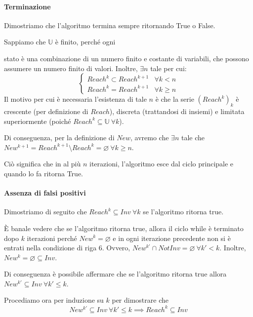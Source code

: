 \documentclass[12pt]{article}
\begin{document}
    \paragraph{Terminazione}
    Dimostriamo che l'algoritmo termina sempre ritornando True o False.

    Sappiamo che $\mathbb U$ è finito, perché ogni 
    
    stato è una combinazione di un numero finito e costante di variabili, che possono assumere un numero finito di valori.
    Inoltre, $\exists n$ tale per cui:
    $$
    \begin{cases}
          Reach^k \subset Reach^{k+1} & \forall k < n \\
          Reach^k = Reach^{k+1} & \forall k \geq n
    \end{cases}
    $$
    Il motivo per cui è necessaria l'esistenza di tale $n$ è che la serie $(Reach^k)_k$ è crescente (per definizione di $Reach$), discreta (trattandosi di insiemi) e limitata superiormente (poiché $Reach^k \subseteq \mathbb U\ \forall k$).
    
    Di conseguenza, per la definizione di $New$, avremo che $\exists n$ tale che $New^{k+1} = Reach^{k+1} \setminus Reach^k = \varnothing\ \forall k \geq n$.

    Ciò significa che in al più $n$ iterazioni, l'algoritmo esce dal ciclo principale e quando lo fa ritorna True. 

    \paragraph{Assenza di falsi positivi}
    Dimostriamo di seguito che $Reach^k \subseteq Inv\ \forall k$ se l'algoritmo ritorna true.

    È banale vedere che se l'algoritmo ritorna true, allora il ciclo while è terminato dopo $k$ iterazioni perché $New^k = \varnothing$ e in ogni iterazione precedente non si è entrati nella condizione di riga 6. Ovvero, $New^{k'} \cap NotInv = \varnothing\ \forall k' < k$.
    Inoltre, $New^k = \varnothing \subseteq Inv$.

    Di conseguenza è possibile affermare che se l'algoritmo ritorna true allora $New^{k'} \subseteq Inv\ \forall k' \leq k$.

    Procediamo ora per induzione su $k$ per dimostrare che 
    \begin{equation}\label{th:true:tesi}
        New^{k'} \subseteq Inv\ \forall k' \leq k \implies Reach^k \subseteq Inv
    \end{equation}
    
\end{document}

